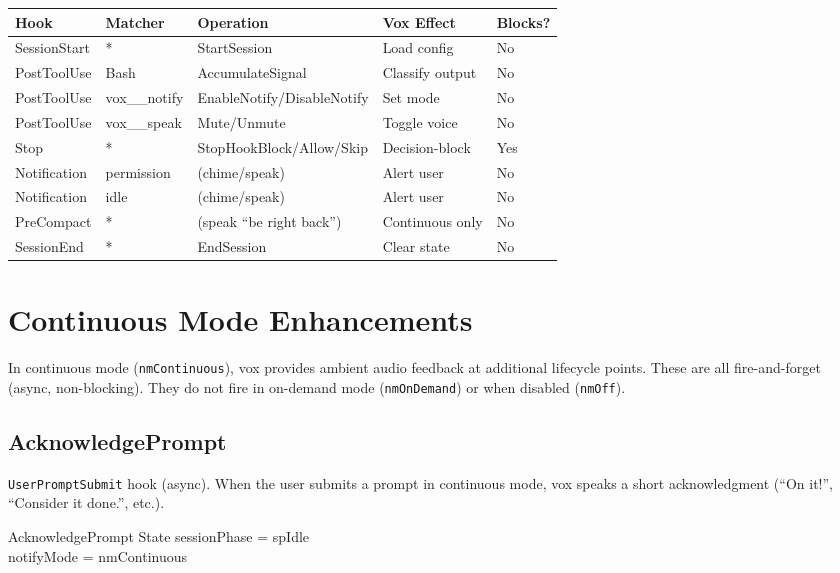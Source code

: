\documentclass[a4paper,10pt,fleqn]{article}
\begin{document}
\begin{tabular}{lllll}
\hline
\textbf{Hook} & \textbf{Matcher} & \textbf{Operation} & \textbf{Vox Effect} & \textbf{Blocks?} \\
\hline
SessionStart & * & StartSession & Load config & No \\
PostToolUse & Bash & AccumulateSignal & Classify output & No \\
PostToolUse & vox\_\_notify & EnableNotify/DisableNotify & Set mode & No \\
PostToolUse & vox\_\_speak & Mute/Unmute & Toggle voice & No \\
Stop & * & StopHookBlock/Allow/Skip & Decision-block & Yes \\
Notification & permission & (chime/speak) & Alert user & No \\
Notification & idle & (chime/speak) & Alert user & No \\
PreCompact & * & (speak ``be right back'') & Continuous only & No \\
SessionEnd & * & EndSession & Clear state & No \\
\hline
\end{tabular}

\section{Continuous Mode Enhancements}

In continuous mode (\texttt{nmContinuous}), vox provides ambient
audio feedback at additional lifecycle points. These are all
fire-and-forget (async, non-blocking). They do not fire in
on-demand mode (\texttt{nmOnDemand}) or when disabled (\texttt{nmOff}).

\subsection{AcknowledgePrompt}

\texttt{UserPromptSubmit} hook (async). When the user submits a
prompt in continuous mode, vox speaks a short acknowledgment
(``On it!'', ``Consider it done.'', etc.).

\begin{schema}{AcknowledgePrompt}
  \Xi State
  \where
  sessionPhase = spIdle \\
  notifyMode = nmContinuous
\end{schema}
\end{document}
